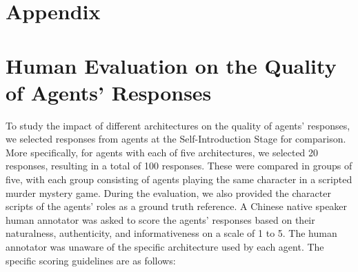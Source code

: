 \documentclass[11pt]{article}
\begin{document}




\clearpage
\appendix
\section*{Appendix}
\section{Human Evaluation on the Quality of Agents' Responses}

To study the impact of different architectures on the quality of agents' responses, we selected responses from agents at the Self-Introduction Stage for comparison. More specifically, for agents with each of five architectures, we selected 20 responses, resulting in a total of 100 responses. These were compared in groups of five, with each group consisting of agents playing the same character in a scripted murder mystery game. During the evaluation, we also provided the character scripts of the agents' roles as a ground truth reference. A Chinese native speaker human annotator was asked to score the agents' responses based on their naturalness, authenticity, and informativeness on a scale of 1 to 5. The human annotator was unaware of the specific architecture used by each agent. The specific scoring guidelines are as follows:
\end{document}
